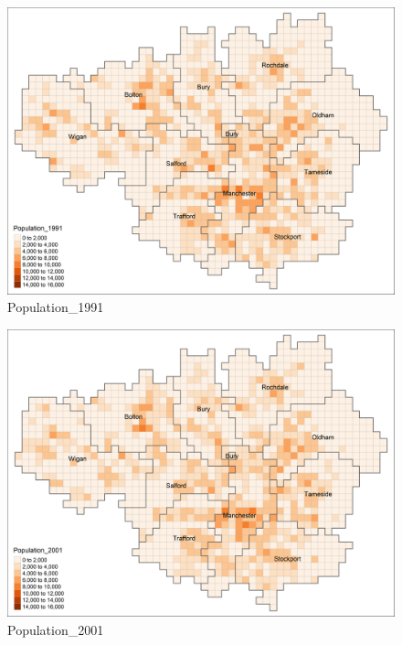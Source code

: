 \documentclass[
]{article}
\begin{document}
\begin{figure}
\centering
\includegraphics{Population_1991.png}
\caption{Population\_1991}
\end{figure}

\begin{figure}
\centering
\includegraphics{Population_2001.png}
\caption{Population\_2001}
\end{figure}
\end{document}
